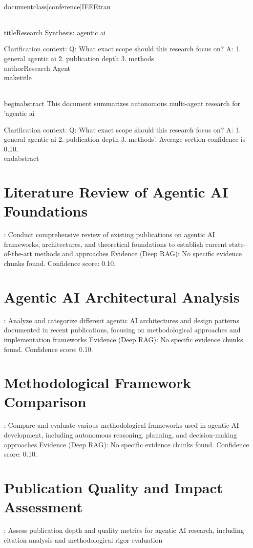 \\documentclass[conference]{IEEEtran}
\begin{document}
\\titleResearch Synthesis: agentic ai

Clarification context:
Q: What exact scope should this research focus on?
A: 1. general agentic ai 
2. publication depth
3. methods
\\authorResearch Agent
\\maketitle

\\begin{abstract}
This document summarizes autonomous multi-agent research for 'agentic ai

Clarification context:
Q: What exact scope should this research focus on?
A: 1. general agentic ai 
2. publication depth
3. methods'. Average section confidence is 0.10.
\\end{abstract}

\section{Literature Review of Agentic AI Foundations}\nObjective: Conduct comprehensive review of existing publications on agentic AI frameworks, architectures, and theoretical foundations to establish current state-of-the-art methods and approaches
Evidence (Deep RAG):
No specific evidence chunks found.
Confidence score: 0.10.\n\n\section{Agentic AI Architectural Analysis}\nObjective: Analyze and categorize different agentic AI architectures and design patterns documented in recent publications, focusing on methodological approaches and implementation frameworks
Evidence (Deep RAG):
No specific evidence chunks found.
Confidence score: 0.10.\n\n\section{Methodological Framework Comparison}\nObjective: Compare and evaluate various methodological frameworks used in agentic AI development, including autonomous reasoning, planning, and decision-making approaches
Evidence (Deep RAG):
No specific evidence chunks found.
Confidence score: 0.10.\n\n\section{Publication Quality and Impact Assessment}\nObjective: Assess publication depth and quality metrics for agentic AI research, including citation analysis and methodological rigor evaluation
\end{document}
